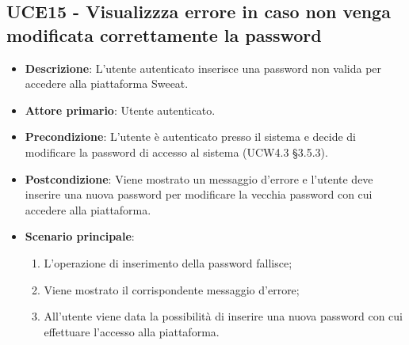\subsection{UCE15 - Visualizzza errore in caso non venga modificata correttamente la password}
\begin{itemize}
\item \textbf{Descrizione}: L'utente autenticato inserisce una password non valida per accedere alla piattaforma Sweeat.
\item \textbf{Attore primario}: Utente autenticato.
\item \textbf{Precondizione}: L'utente è autenticato presso il sistema e decide di modificare la password di accesso al sistema (UCW4.3 §3.5.3).
\item \textbf{Postcondizione}: Viene mostrato un messaggio d'errore e l'utente deve inserire una nuova password per modificare la vecchia password con cui accedere alla piattaforma.

\item \textbf{Scenario principale}:
\begin{enumerate}
\item L'operazione di inserimento della password fallisce;
\item Viene mostrato il corrispondente messaggio d'errore;
\item All'utente viene data la possibilità di inserire una nuova password con cui effettuare l'accesso alla piattaforma.
\end{enumerate}
\end{itemize}